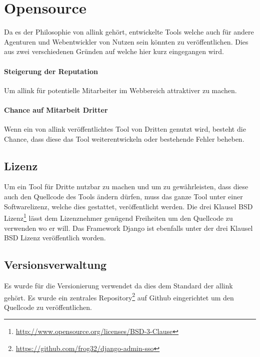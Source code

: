 \section{Opensource}
\label{sec:opensource}
Da es der Philosophie von allink gehört, entwickelte Tools welche auch für andere Agenturen und Webentwickler von Nutzen sein könnten zu veröffentlichen. Dies aus zwei verschiedenen Gründen auf welche hier kurz eingegangen wird.

\paragraph{Steigerung der Reputation}
\label{par:steigerung_der_reputation}
Um allink für potentielle Mitarbeiter im Webbereich attraktiver zu machen.
\paragraph{Chance auf Mitarbeit Dritter}
\label{par:chance_auf_mitarbeit_dritter}
Wenn ein von allink veröffentlichtes Tool von Dritten genutzt wird, besteht die Chance, dass diese das Tool weiterentwickeln oder bestehende Fehler beheben.

\subsection{Lizenz}
\label{sub:lizenz}
Um ein Tool für Dritte nutzbar zu machen und um zu gewährleisten, dass diese auch den Quellcode des Tools ändern dürfen, muss das ganze Tool unter einer Softwarelizenz, welche dies gestattet, veröffentlicht werden. Die drei Klausel BSD Lizenz\footnote{\url{http://www.opensource.org/licenses/BSD-3-Clause}} lässt dem Lizenznehmer genügend Freiheiten um den Quellcode zu verwenden wo er will. Das Framework Django ist ebenfalls unter der drei Klausel BSD Lizenz veröffentlich worden.

\subsection{Versionsverwaltung}
\label{sub:versionsverwaltung}
Es wurde  für die Versionierung verwendet da dies dem Standard der allink gehört. Es wurde ein zentrales Repository\footnote{\url{https://github.com/frog32/django-admin-sso}} auf Github eingerichtet um den Quellcode zu veröffentlichen.

